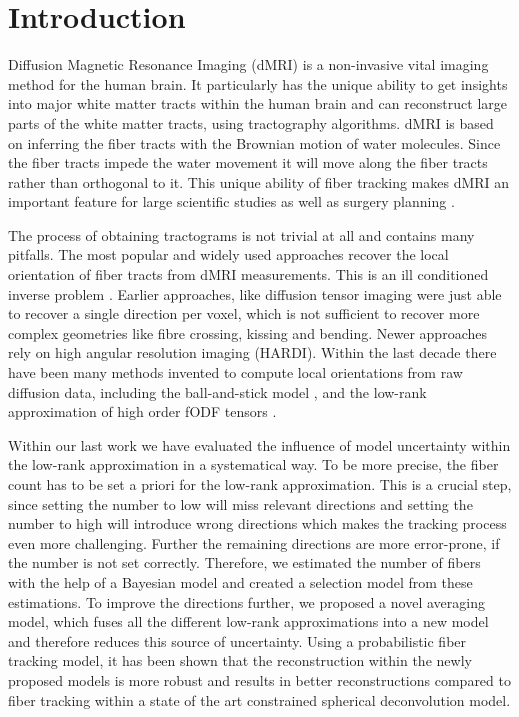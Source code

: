 \section{Introduction}
Diffusion Magnetic Resonance Imaging (dMRI) \cite{LeBihan:1986} is a
non-invasive vital imaging method for the human brain. It particularly has the
unique ability to get insights into major white matter tracts within the human
brain and can
reconstruct large parts of the white matter tracts, using tractography algorithms. dMRI is based on
inferring the fiber tracts with the Brownian motion of water molecules. Since
the fiber tracts impede the water movement it will move along the fiber tracts
rather than orthogonal to it. 
This unique ability of fiber tracking makes dMRI an important feature for large
scientific studies \cite{Sotiropoulos:2013, Tobisch:2018Frontiers} as well as surgery planning \cite{Yang:2021}.

The process of obtaining tractograms is not trivial at all and contains many
pitfalls. The most popular and widely used approaches recover the local
orientation of fiber tracts from dMRI measurements. This is an ill
conditioned inverse problem \cite{TOURNIER20071459}. Earlier approaches, like
diffusion tensor imaging \cite{BASSER1994247}
were just able to recover a single direction per voxel, which is not sufficient
to recover more complex geometries like fibre crossing, kissing and bending.
Newer approaches rely on high angular resolution imaging (HARDI). Within the
last decade there have been many methods invented to compute local orientations
from raw diffusion data, including the
ball-and-stick model \cite{BEHRENS2007144}, and the low-rank approximation of high order fODF tensors
\cite{lowrank, Ankele:CARS2017}.

Within our last work we have evaluated the influence of model uncertainty within
the low-rank approximation in a systematical way. To be more precise, the fiber
count has to be set a priori for the low-rank approximation. This is a
crucial step, since setting the number to low will miss relevant directions and
setting the number to high will introduce wrong directions which makes the
tracking process even more challenging. Further the remaining directions are
more error-prone, if the number is not set correctly. 
Therefore, we estimated the number of fibers with the help of a Bayesian model and
created a selection model from these estimations. To improve the directions
further, we proposed a novel averaging model, which fuses all the different
low-rank approximations into a new model and therefore reduces this source of uncertainty.
Using a probabilistic fiber tracking model, it has been shown that the
reconstruction within the newly proposed models is more robust and results in
better reconstructions compared to fiber tracking within a state of the art
constrained spherical deconvolution model.

